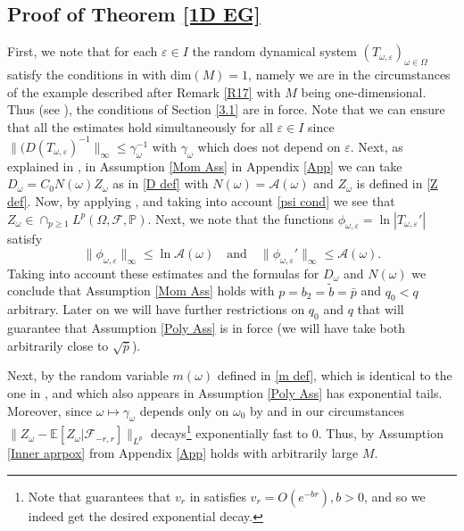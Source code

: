 \documentclass[11pt,reqno,a4paper]{article}
\theoremstyle{special}
\def\om{\omega}
\begin{document}
\subsection{Proof of Theorem \ref{1D EG}}\label{pf1d}


First, we note that for each $\varepsilon\in I$ the random dynamical system $(T_{\om,\varepsilon})_{\om\in\Omega}$ 
satisfy the conditions in \cite[Section 3.3]{YH 23} with $\text{dim}(M)=1$, namely we are in the  circumstances of the example described after Remark \ref{R17} with $M$ being one-dimensional.
Thus (see \cite[Section 3.3]{YH 23}), the conditions of Section \ref{3.1} are in force. Note that we can ensure that all the estimates hold simultaneously for all $\varepsilon\in I$ since  $\|(D(T_{\om,\varepsilon})^{-1}\|_\infty \leq \gamma_\om^{-1}$ with $\gamma_\om$ which does not depend on $\varepsilon$.   Next, as explained in \cite[Section 3.3]{YH 23},  in Assumption \ref{Mom Ass} in Appendix \ref{App} we can take $D_\om=C_0N(\om)Z_\om$ as in \eqref{D def} with $N(\om)=\mathcal A(\om)$ and $Z_\om$  is defined in \eqref{Z def}. 
Now, by applying \cite[Lemma 3.5 (i)]{YH 23}, \cite[Lemma 3.7]{YH 23} and taking into account \eqref{psi cond} we see that   $Z_\om\in \cap_{p\geq 1}L^p(\Omega,\mathcal F, \mathbb P)$. 
Next, we note that the functions $\phi_{\om,\varepsilon}=\ln|T_{\om,\varepsilon}'|$ satisfy 
$$
\|\phi_{\om,\varepsilon}\|_\infty\leq \ln \mathcal A(\om) \quad \text{and} \quad 
\|\phi_{\om,\varepsilon}'\|_\infty\leq \mathcal A(\om).
$$
Taking into account these estimates and the formulas for $D_\om$ and $N(\om)$  we conclude that  Assumption \ref{Mom Ass} holds with $p=b_2=\tilde b=\bar p$ and  $q_0<q$ arbitrary. Later on we will have further restrictions on $q_0$ and $q$ that will guarantee that Assumption \ref{Poly Ass} is in force (we will have take both arbitrarily close to $\sqrt{\bar p}$). 


Next,  by \cite[Lemma 3.10]{YH 23} the random variable $m(\om)$ defined in \eqref{m def}, which is identical to the one in \cite[(3.5)]{YH 23}, and which also appears in Assumption \ref{Poly Ass} has exponential tails. Moreover, since $\om\mapsto \gamma_\om$  depends only on $\om_0$ by  \cite[Lemma 3.5 (i)]{YH 23} and \cite[Corollary 3.7]{YH 23} in our circumstances $\|Z_{\om}-\mathbb E[Z_\om|\mathcal F_{-r,r}]\|_{L^p}$ decays\footnote{Note that \cite[Lemma 3.5 (i)]{YH 23} guarantees that $v_r$ in \cite[Corollary 3.7]{YH 23} satisfies $v_r=O(e^{-br}), b>0$, and so we indeed get the desired exponential decay.} exponentially fast to $0$.   
Thus, by \cite[Lemma 3.11]{YH 23} Assumption \ref{Inner aprpox} from Appendix \ref{App} 
holds with arbitrarily large $M$.
\end{document}
